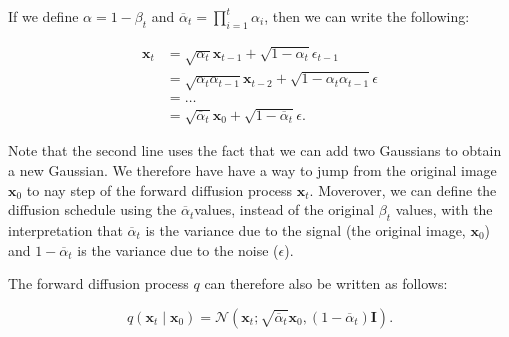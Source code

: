 If we define \( \alpha = 1 - \beta_t  \) and \( \overline{\alpha}_t  = \prod_{i=1}^{t} \alpha_i \), then we can write the following:

\begin{align*}
    \mathbf{x}_t &= \sqrt{\alpha_t} \mathbf{x}_{t-1} + \sqrt{1- \alpha_t} \epsilon_{t-1} \\
                &= \sqrt{\alpha_t \alpha_{t-1}} \mathbf{x}_{t-2} + \sqrt{1- \alpha _t \alpha_{t-1}} \epsilon \\
                &= \ldots  \\
                &= \sqrt{\overline{\alpha}_t}  \mathbf{x}_0 + \sqrt{1- \overline{\alpha }_t} \epsilon
.\end{align*}


Note that the second line uses the fact that we can add two Gaussians to obtain a new Gaussian.
We therefore have have a way to jump from the original image \( \mathbf{x}_0 \) to nay step of the forward diffusion process \( \mathbf{x}_t \).
Moverover, we can define the diffusion schedule using the \( \overline{\alpha }_t \)values, instead of the original \( \beta _t \) values, with the interpretation that \( \overline{\alpha }_t \) is the variance due to the signal (the original image, \( \mathbf{x}_0 \)) and \( 1 - \overline{\alpha }_t \) is the variance due to the noise (\( \epsilon \)).

The forward diffusion process \( q \) can therefore also be written as follows: 

\[
    q(\mathbf{x}_t  \mid  \mathbf{x}_0) = \mathcal{N}\left(\mathbf{x}_t; \sqrt{\overline{\alpha }_t } \mathbf{x}_0, (1 - \overline{\alpha }_t) \mathbf{I}\right)
.\] 

